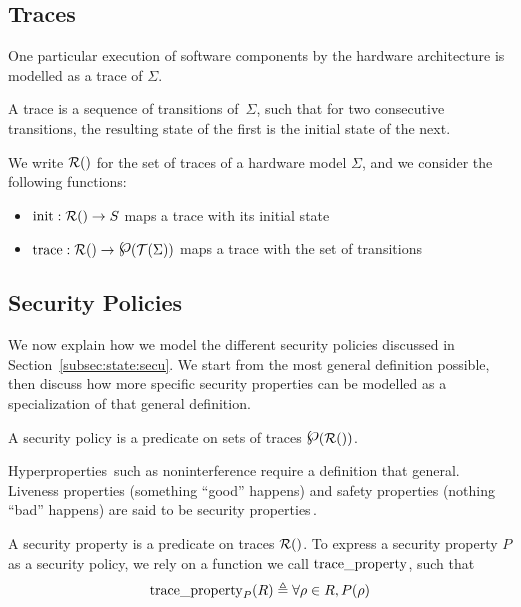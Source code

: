 \subsection{Traces}
\label{subsec:speccert:trace}

One particular execution of software components by the hardware architecture is
modelled as a trace of $\Sigma$.

\begin{definition}[Traces]
  \label{def:speccert:trace}
  A trace is a sequence of transitions of~$\Sigma$, such that for two
  consecutive transitions, the resulting state of the first is the initial state
  of the next.

  We write $\pathesLTS{Ez}$ for the set of traces of a hardware model $\Sigma$,
  and we consider the following functions:
  \begin{itemize}
  \item $\func{init} : \pathesLTS{Ez} \rightarrow S$ maps a trace with its
    initial state
  \item
    $\func{trace} : \pathesLTS{Ez} \rightarrow \powerset(\mathcal{T}(\Sigma))$
    maps a trace with the set of transitions
  \end{itemize}
\end{definition}

\subsection{Security Policies}
\label{subsec:speccert:security}

We now explain how we model the different security policies discussed in
Section~\ref{subsec:state:secu}.
%
We start from the most general definition possible, then discuss how more
specific security properties can be modelled as a specialization of that general
definition.

\begin{definition}
  \label{def:speccert:secpol}
  A security policy is a predicate on sets of traces
  $\powerset(\pathesLTS{Ez})$.
\end{definition}

Hyperproperties\,\cite{clarkson2010hyperproperties} such as noninterference
require a definition that general.
%
Liveness properties (something ``good'' happens) and safety properties (nothing
``bad'' happens) are said to be security
properties\,\cite{schneider2000enforceable}.

\begin{definition}
  A security property is a predicate on traces $\pathesLTS{Ez}$.
  To express a security property $P$ as a security policy, we rely on a function
  we call $\mathrm{trace\_property}$, such that
  \[
    \mathrm{trace\_property}_{P}(R) \triangleq \forall \rho \in R, P(\rho)
  \]
\end{definition}

